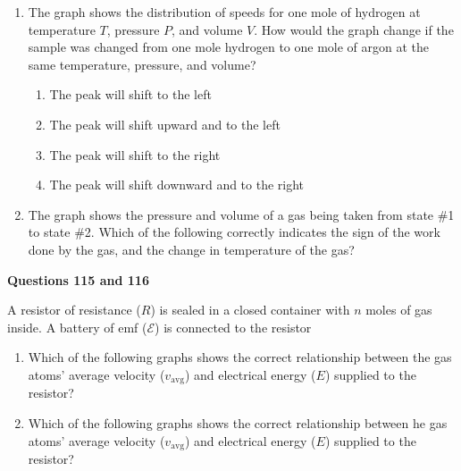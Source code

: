 \documentclass{../../oss-apphys}
\begin{document}
\begin{multicols}{2}
\begin{enumerate}[leftmargin=18pt,start=24]
  \item The graph shows the distribution of speeds for one mole of hydrogen at
    temperature $T$, pressure $P$, and volume $V$. How would the graph change
    if the sample was changed from one mole hydrogen to one mole of argon at
    the same temperature, pressure, and volume?
    \begin{enumerate}[noitemsep,topsep=0pt,leftmargin=18pt,label=(\Alph*)]
    \item The peak will shift to the left
    \item The peak will shift upward and to the left
    \item The peak will shift to the right
    \item The peak will shift downward and to the right
    \end{enumerate}
    
  \item The graph shows the pressure and volume of a gas being taken from state
    \#1 to state \#2. Which of the following correctly indicates the sign of
    the work done by the gas, and the change in temperature of the gas?

  \end{enumerate}
  

  \textbf{Questions 115 and 116}
  
  A resistor of resistance ($R$) is sealed in a closed container with $n$ moles
  of gas inside. A battery of emf ($\mathcal{E}$) is connected to the resistor

  \begin{enumerate}
  \item Which of the following graphs shows the correct relationship between
    the gas atoms’ average velocity ($v_{\textrm{avg}}$) and electrical energy
    ($E$) supplied to the resistor?

  \item Which of the following graphs shows the correct relationship between
    he gas atoms’ average velocity ($v_{\textrm{avg}}$) and electrical energy
    ($E$) supplied to the resistor?
  \end{enumerate}
\end{multicols}

\newpage
{}
\end{document}

